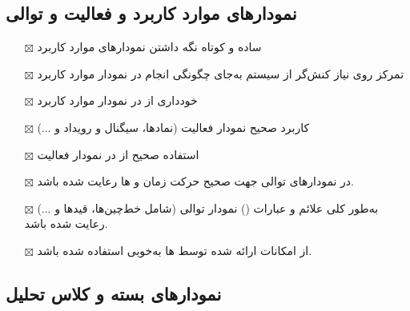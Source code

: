 \subsection{\hspace*{0.2cm}نمودارهای موارد کاربرد و فعالیت و توالی}

\begin{itemize} \setlength\itemsep{0cm}
	\item[$\boxtimes$]
	ساده و کوتاه نگه داشتن نمودارهای موارد کاربرد
	\item[$\boxtimes$]
	تمرکز روی نیاز کنش‌گر از سیستم به‌جای چگونگی انجام در نمودار موارد کاربرد
	\item[$\boxtimes$]
	خودداری از  در نمودار موارد کاربرد
	\item[$\boxtimes$]
	کاربرد صحیح  نمودار فعالیت (نمادها، سیگنال و رویداد و ...)
	\item[$\boxtimes$]
	استفاده صحیح از  در نمودار فعالیت
	\item[$\boxtimes$]
	در نمودارهای توالی جهت صحیح حرکت زمان و ها رعایت شده باشد.
	\item[$\boxtimes$]
	به‌طور کلی علائم و عبارات () نمودار توالی (شامل خط‌چین‌ها، قیدها و ...) رعایت شده باشد.
	\item[$\boxtimes$]
	از امکانات ارائه شده توسط ها به‌خوبی استفاده شده باشد.
	
\end{itemize}

\subsection{\hspace*{0.2cm}نمودارهای بسته و کلاس تحلیل}

